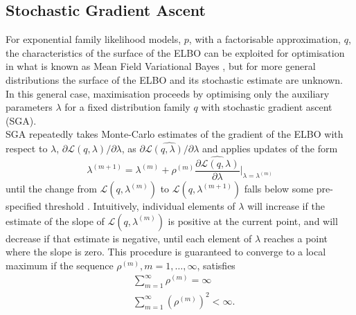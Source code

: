 \documentclass[12pt,a4paper]{article}\usepackage[]{graphicx}\usepackage[]{color}
\begin{document}
\subsection{Stochastic Gradient Ascent}
\label{subsec:SGA}
For exponential family likelihood models, $p$, with a factorisable approximation, $q$, the characteristics of the surface of the ELBO can be exploited for optimisation in what is known as Mean Field Variational Bayes \citep{Jordan1999, Ghahramani2000, Wainwright2008}, but for more general distributions the surface of the ELBO and its stochastic estimate are unknown. In this general case, maximisation proceeds by optimising only the auxiliary parameters $\lambda$ for a fixed distribution family $q$ with stochastic gradient ascent (SGA).
\\

SGA repeatedly takes Monte-Carlo estimates of the gradient of the ELBO with respect to $\lambda$, $\partial\mathcal{L}(q, \lambda) / \partial \lambda$, as $\widehat{\partial\mathcal{L}(q, \lambda) / \partial \lambda}$ and applies updates of the form
\begin{equation}
\label{gradientAscent}
\lambda^{(m+1)} = \lambda^{(m)} + \rho^{(m)} \widehat{\frac{\partial\mathcal{L}(q, \lambda)}{\partial \lambda}} \bigg\rvert_{\lambda = \lambda^{(m)}}
\end{equation}
until the change from $\mathcal{L}(q, \lambda^{(m)})$ to $\mathcal{L}(q, \lambda^{(m+1)})$ falls below some pre-specified threshold \citep{Hoffman2013}. Intuitively, individual elements of $\lambda$ will increase if the estimate of the slope of $\mathcal{L}(q, \lambda^{(m)})$ is positive at the current point, and will decrease if that estimate is negative, until each element of $\lambda$ reaches a point where the slope is zero. This procedure is guaranteed to converge to a local maximum \citep{Robbins1951} if the sequence $\rho^{(m)}, m = 1, \dots, \infty$, satisfies
\begin{align}
&\sum_{m=1}^{\infty} \rho^{(m)} =  \infty \\
&\sum_{m=1}^{\infty} (\rho^{(m)})^2 <  \infty.
\end{align}
\\
\end{document}
